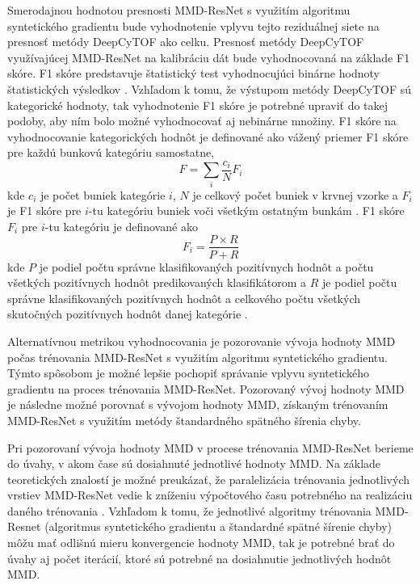 Smerodajnou hodnotou presnosti MMD-ResNet s využitím algoritmu syntetického gradientu bude vyhodnotenie vplyvu tejto reziduálnej siete na presnosť metódy DeepCyTOF ako celku. Presnosť metódy DeepCyTOF využívajúcej MMD-ResNet na kalibráciu dát bude vyhodnocovaná na základe F1 skóre. F1 skóre predstavuje štatistický test vyhodnocujúci binárne hodnoty štatistických výsledkov \cite{sasaki2007truth}. Vzhľadom k tomu, že výstupom metódy DeepCyTOF sú kategorické hodnoty, tak vyhodnotenie F1 skóre je potrebné upraviť do takej podoby, aby ním bolo možné vyhodnocovať aj nebinárne množiny. F1 skóre na vyhodnocovanie kategorických hodnôt je definované ako vážený priemer F1 skóre pre každú bunkovú kategóriu samostatne, 
\begin{equation}
    F=\sum_i \frac{c_i}{N}F_i
\end{equation}
kde $c_i$ je počet buniek kategórie $i$, $N$ je celkový počet buniek v krvnej vzorke a $F_i$ je F1 skóre pre $i$-tu kategóriu buniek voči všetkým ostatným bunkám \cite{Li2017}. F1 skóre $F_i$ pre $i$-tu kategóriu je definované ako 
\begin{equation}
F_i=\frac{P \times R}{P + R}
\end{equation}
kde $P$ je podiel počtu správne klasifikovaných pozitívnych hodnôt a počtu všetkých pozitívnych hodnôt predikovaných klasifikátorom a $R$ je podiel počtu správne klasifikovaných pozitívnych hodnôt a celkového počtu všetkých skutočných pozitívnych hodnôt danej kategórie \cite{sasaki2007truth}.

Alternatívnou metrikou vyhodnocovania je pozorovanie vývoja hodnoty MMD počas trénovania MMD-ResNet s využitím algoritmu syntetického gradientu. Týmto spôsobom je možné lepšie pochopiť správanie vplyvu syntetického gradientu na proces trénovania MMD-ResNet. Pozorovaný vývoj hodnoty MMD je následne možné porovnať s vývojom hodnoty MMD, získaným trénovaním MMD-ResNet s využitím metódy štandardného spätného šírenia chyby.

Pri pozorovaní vývoja hodnoty MMD v procese trénovania MMD-ResNet berieme do úvahy, v akom čase sú dosiahnuté jednotlivé hodnoty MMD. Na základe teoretických znalostí je možné preukázať, že paralelizácia trénovania jednotlivých vrstiev MMD-ResNet vedie k zníženiu výpočtového času potrebného na realizáciu daného trénovania \cite{Jaderberg2016, Czarnecki2017}. Vzhľadom k tomu, že jednotlivé algoritmy trénovania MMD-Resnet (algoritmus syntetického gradientu a štandardné spätné šírenie chyby) môžu mať odlišnú mieru konvergencie hodnoty MMD, tak je potrebné brať do úvahy aj počet iterácií, ktoré sú potrebné na dosiahnutie jednotlivých hodnôt MMD.

